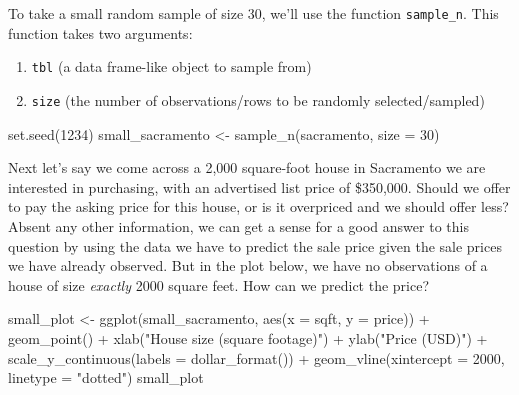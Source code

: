 \documentclass[
]{krantz}
\makeatletter
\newenvironment{Shaded}{\begin{snugshade}}{\end{snugshade}}
\newcommand{\AttributeTok}[1]{\textcolor[rgb]{0.61,0.61,0.61}{#1}}
\newcommand{\DecValTok}[1]{\textcolor[rgb]{0.06,0.06,0.06}{#1}}
\newcommand{\FunctionTok}[1]{\textcolor[rgb]{0,0,0}{#1}}
\newcommand{\NormalTok}[1]{#1}
\newcommand{\OtherTok}[1]{\textcolor[rgb]{0.37,0.37,0.37}{#1}}
\newcommand{\SpecialCharTok}[1]{\textcolor[rgb]{0,0,0}{#1}}
\newcommand{\StringTok}[1]{\textcolor[rgb]{0.5,0.5,0.5}{#1}}
\providecommand{\tightlist}{%
  \setlength{\itemsep}{0pt}\setlength{\parskip}{0pt}}
\newenvironment{kframe}{%
\medskip{}
\setlength{\fboxsep}{.8em}
 \def\at@end@of@kframe{}%
 \ifinner\ifhmode%
  \def\at@end@of@kframe{\end{minipage}}%
  \begin{minipage}{\columnwidth}%
 \fi\fi%
 \def\FrameCommand##1{\hskip\@totalleftmargin \hskip-\fboxsep
 \colorbox{shadecolor}{##1}\hskip-\fboxsep
     \hskip-\linewidth \hskip-\@totalleftmargin \hskip\columnwidth}%
 \MakeFramed {\advance\hsize-\width
   \@totalleftmargin\z@ \linewidth\hsize
   \@setminipage}}%
 {\par\unskip\endMakeFramed%
 \at@end@of@kframe}
\renewenvironment{Shaded}{\begin{kframe}}{\end{kframe}}
\makeatother
\begin{document}
To take a small random sample of size 30, we'll use the function \texttt{sample\_n}.
This function takes two arguments:

\begin{enumerate}
\def\labelenumi{\arabic{enumi}.}
\tightlist
\item
  \texttt{tbl} (a data frame-like object to sample from)
\item
  \texttt{size} (the number of observations/rows to be randomly selected/sampled)
\end{enumerate}

\begin{Shaded}
\begin{Highlighting}[]
\FunctionTok{set.seed}\NormalTok{(}\DecValTok{1234}\NormalTok{)}
\NormalTok{small\_sacramento }\OtherTok{\textless{}{-}} \FunctionTok{sample\_n}\NormalTok{(sacramento, }\AttributeTok{size =} \DecValTok{30}\NormalTok{)}
\end{Highlighting}
\end{Shaded}

Next let's say we come across a 2,000 square-foot house in Sacramento we are
interested in purchasing, with an advertised list price of \$350,000. Should we
offer to pay the asking price for this house, or is it overpriced and we should
offer less? Absent any other information, we can get a sense for a good answer
to this question by using the data we have to predict the sale price given the
sale prices we have already observed. But in the plot below, we have no
observations of a house of size \emph{exactly} 2000 square feet. How can we predict
the price?

\begin{Shaded}
\begin{Highlighting}[]
\NormalTok{small\_plot }\OtherTok{\textless{}{-}} \FunctionTok{ggplot}\NormalTok{(small\_sacramento, }\FunctionTok{aes}\NormalTok{(}\AttributeTok{x =}\NormalTok{ sqft, }\AttributeTok{y =}\NormalTok{ price)) }\SpecialCharTok{+}
  \FunctionTok{geom\_point}\NormalTok{() }\SpecialCharTok{+}
  \FunctionTok{xlab}\NormalTok{(}\StringTok{"House size (square footage)"}\NormalTok{) }\SpecialCharTok{+}
  \FunctionTok{ylab}\NormalTok{(}\StringTok{"Price (USD)"}\NormalTok{) }\SpecialCharTok{+}
  \FunctionTok{scale\_y\_continuous}\NormalTok{(}\AttributeTok{labels =} \FunctionTok{dollar\_format}\NormalTok{()) }\SpecialCharTok{+}
  \FunctionTok{geom\_vline}\NormalTok{(}\AttributeTok{xintercept =} \DecValTok{2000}\NormalTok{, }\AttributeTok{linetype =} \StringTok{"dotted"}\NormalTok{)}
\NormalTok{small\_plot}
\end{Highlighting}
\end{Shaded}
\end{document}
